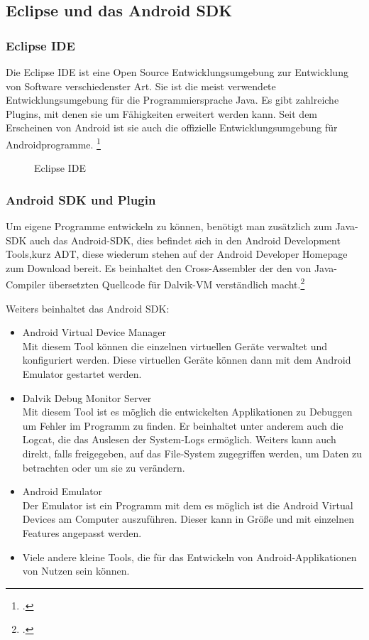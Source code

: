 
\subsection{Eclipse und das Android SDK}

\subsubsection{Eclipse IDE}
Die Eclipse IDE ist eine Open Source Entwicklungsumgebung zur Entwicklung von Software verschiedenster Art. Sie ist die meist verwendete Entwicklungsumgebung für die Programmiersprache Java. Es gibt zahlreiche Plugins, mit denen sie um Fähigkeiten erweitert werden kann. Seit dem Erscheinen von Android ist sie auch die offizielle Entwicklungsumgebung für Androidprogramme. \footcite[vgl.][]{eclipse} 

\begin{figure}[htbp]
\centering
\caption{Eclipse IDE}
\end{figure}

\subsubsection{Android SDK und Plugin}
Um eigene Programme entwickeln zu können, benötigt man zusätzlich zum Java-SDK auch das Android-SDK, dies befindet sich in den Android Development Tools,kurz ADT, diese wiederum stehen auf der Android Developer Homepage zum Download bereit. Es beinhaltet den Cross-Assembler der den von Java-Compiler übersetzten Quellcode für Dalvik-VM verständlich macht.\footcite[vgl.][]{androidsdk}

Weiters beinhaltet das Android SDK:

\begin{itemize}

\item Android Virtual Device Manager \\
Mit diesem Tool können die einzelnen virtuellen Geräte verwaltet und konfiguriert werden. Diese virtuellen Geräte können dann mit dem Android Emulator gestartet werden.

\item Dalvik Debug Monitor Server \\
Mit diesem Tool ist es möglich die entwickelten Applikationen zu Debuggen um Fehler im Programm zu finden. Er beinhaltet unter anderem auch die Logcat, die das Auslesen der System-Logs ermöglich. Weiters kann auch direkt, falls freigegeben, auf das File-System zugegriffen werden, um Daten zu betrachten oder um sie zu verändern.
  \item Android Emulator \\
Der Emulator ist ein Programm mit dem es möglich ist die Android Virtual Devices am Computer auszuführen. Dieser kann in Größe und mit einzelnen Features angepasst werden.


\item Viele andere kleine Tools, die für das Entwickeln von Android-Applikationen von Nutzen sein können.
\end{itemize}

